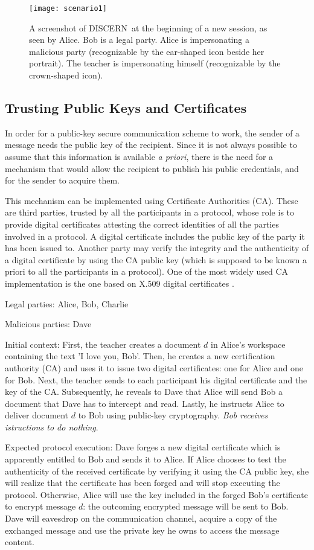 \documentclass[conference]{IEEEtran}
\def\disgrace{DISCERN}
\begin{document}
\begin{figure*}
\centering
\texttt{[image: scenario1]}
\caption{A screenshot of \disgrace\ at the beginning of a new session, as seen by Alice. Bob is a legal party. Alice is impersonating a malicious party (recognizable by the ear-shaped icon beside her portrait). The teacher is impersonating himself (recognizable by the crown-shaped icon).}
\label{fig:scenario}
\end{figure*}

\subsection{ Trusting Public Keys and Certificates}
In order for a public-key secure communication scheme to work,
the sender of a message needs the public key of the recipient.
Since it is not always possible to assume that this information
is available {\em a priori}, there is the need for a mechanism
that would allow the recipient to publish his public credentials, and
for the sender to acquire them.

This mechanism can be implemented using Certificate Authorities (CA). These
are third parties, trusted by all the participants in a protocol, whose
role is to provide digital certificates attesting the correct
identities of all the parties involved in a protocol. A digital
certificate includes the public key of the party it has been issued
to. Another party may verify the integrity and the authenticity of a
digital certificate by using the CA public key (which is supposed to
be known a priori to all the participants in a protocol). One of the
most widely used CA implementation is the one based
on X.509 digital certificates \cite{x509}.

{\sc Legal parties:} Alice, Bob, Charlie

{\sc Malicious parties:} Dave

{\sc Initial context:} First, the teacher creates a document $d$
in Alice's workspace containing the text 'I love you, Bob'.
Then, he creates a new certification authority (CA) and uses it to issue
two digital certificates: one for Alice and one for Bob. Next, the
teacher sends to each participant his digital certificate and the key
of the CA.  Subsequently, he reveals
to Dave that Alice will send Bob a document that Dave has to
intercept and read. Lastly, he instructs Alice to deliver
document $d$ to Bob using public-key cryptography. {\em Bob receives
istructions to do nothing}.

{\sc Expected protocol execution:} Dave forges a new digital
certificate which is apparently entitled to Bob and sends it to
Alice. If Alice chooses to test the authenticity of the received
certificate by verifying it using the CA public key, she will realize
that the certificate has been forged and will stop executing the
protocol. Otherwise, Alice will use the key included in the forged
Bob's certificate to encrypt message $d$: the outcoming
encrypted message will be sent to Bob. Dave will eavesdrop on the
communication channel, acquire a copy of the exchanged message
and use the private key he owns to access the message content.
\end{document}
